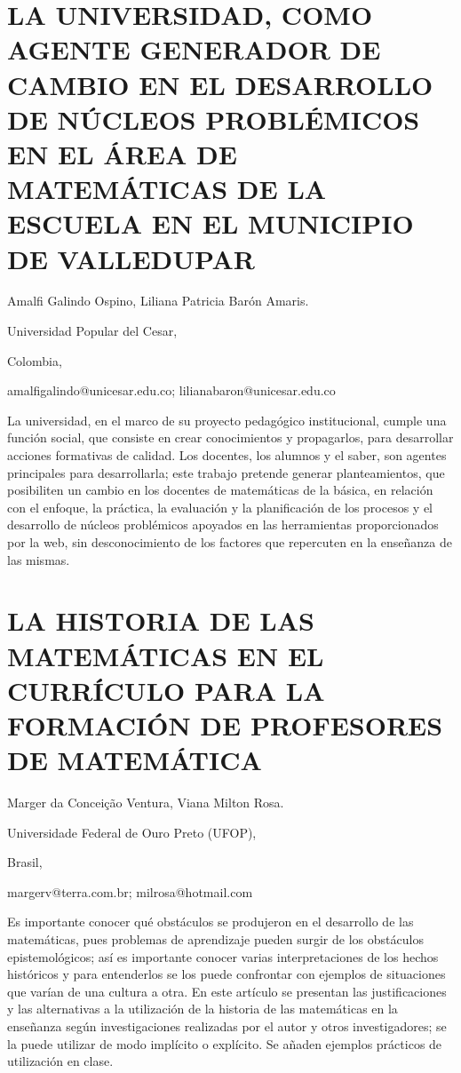 \section{LA UNIVERSIDAD, COMO AGENTE GENERADOR DE CAMBIO EN EL DESARROLLO
DE NÚCLEOS PROBLÉMICOS EN EL ÁREA DE MATEMÁTICAS DE LA ESCUELA EN
EL MUNICIPIO DE VALLEDUPAR}

\begin{datos}

Amalfi Galindo Ospino, Liliana Patricia Barón Amaris.

Universidad Popular del Cesar,

Colombia,

amalfigalindo@unicesar.edu.co; lilianabaron@unicesar.edu.co

\end{datos}

La universidad, en el marco de su proyecto pedagógico institucional,
cumple una función social, que consiste en crear conocimientos y propagarlos,
para desarrollar acciones formativas de calidad. Los docentes, los
alumnos y el saber, son agentes principales para desarrollarla; este
trabajo pretende generar planteamientos, que posibiliten un cambio
en los docentes de matemáticas de la básica, en relación con el enfoque,
la práctica, la evaluación y la planificación de los procesos y el
desarrollo de núcleos problémicos apoyados en las herramientas proporcionados
por la web, sin desconocimiento de los factores que repercuten en
la enseñanza de las mismas.


\section{LA HISTORIA DE LAS MATEMÁTICAS EN EL CURRÍCULO PARA LA FORMACIÓN
DE PROFESORES DE MATEMÁTICA}

\begin{datos}

Marger da Conceição Ventura, Viana Milton Rosa.

Universidade Federal de Ouro Preto (UFOP),

Brasil,

margerv@terra.com.br; milrosa@hotmail.com 

\end{datos}

Es importante conocer qué obstáculos se produjeron en el desarrollo
de las matemáticas, pues problemas de aprendizaje pueden surgir de
los obstáculos epistemológicos; así es importante conocer varias interpretaciones
de los hechos históricos y para entenderlos se los puede confrontar
con ejemplos de situaciones que varían de una cultura a otra. En este
artículo se presentan las justificaciones y las alternativas a la
utilización de la historia de las matemáticas en la enseñanza según
investigaciones realizadas por el autor y otros investigadores; se
la puede utilizar de modo implícito o explícito. Se añaden ejemplos
prácticos de utilización en clase. 



